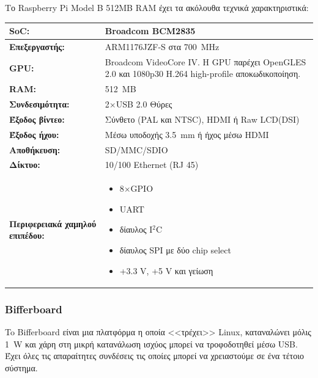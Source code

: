 \documentclass[12pt, a4paper, oneside]{report}
\begin{document}
Το Raspberry Pi Model B 512MB RAM έχει τα ακόλουθα τεχνικά χαρακτηριστικά:
\begin{table}[!hb]
\centering
{\renewcommand{\arraystretch}{1.5}
\renewcommand{\tabcolsep}{0.2cm}
\footnotesize
\begin{tabular}{L{0.3\textwidth} L{0.65\textwidth}}
\hline
\textbf{SoC:} & Broadcom BCM2835\\ \hline
\textbf{Επεξεργαστής:} &  ARM1176JZF-S στα 700~MHz\\ \hline
\textbf{GPU:} & Broadcom VideoCore IV. Η GPU παρέχει OpenGLES 2.0 και 1080p30 H.264 high-profile αποκωδικοποίηση.\\ \hline
\textbf{RAM:} & 512~MB\\ \hline
\textbf{Συνδεσιμότητα:} & 2$\times$USB 2.0 Θύρες\\ \hline
\textbf{Έξοδος βίντεο:} & Σύνθετο (PAL και NTSC), HDMI ή Raw LCD(DSI)\\ \hline
\textbf{Έξοδος ήχου:} & Μέσω υποδοχής 3.5~mm ή ήχος μέσω HDMI\\ \hline
\textbf{Αποθήκευση:} & SD\slash MMC\slash SDIO\\ \hline
\textbf{Δίκτυο:} & 10\slash 100 Ethernet (RJ 45)\\ \hline
\textbf{Περιφερειακά χαμηλού επιπέδου:} & \begin{itemize} 
\item 8$\times$GPIO
\item UART
\item δίαυλος I$^2$C
\item δίαυλος SPI με δύο chip select
\item +3.3 V, +5 V και γείωση
\end{itemize}\\ \hline
\end{tabular}
}
\end{table}
\clearpage
\subsubsection{Bif\mbox{}ferboard}

To Bif\mbox{}ferboard είναι μια πλατφόρμα η οποία <<τρέχει>> Linux, καταναλώνει μόλις 1~W και χάρη στη μικρή κατανάλωση ισχύος μπορεί να τροφοδοτηθεί μέσω USB. Έχει όλες τις απαραίτητες συνδέσεις τις οποίες μπορεί να χρειαστούμε σε ένα τέτοιο σύστημα.
\end{document}
